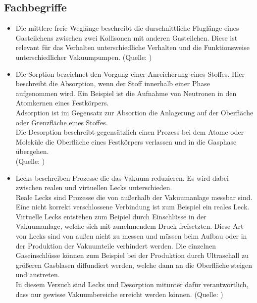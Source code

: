 	\subsection{Fachbegriffe}
	
		\begin{itemize}
			\item
			Die mittlere freie Weglänge beschreibt die durschnittliche Fluglänge eines Gasteilchens zwischen zwei Kollisonen mit anderen Gasteilchen.
			Diese ist relevant für das Verhalten unterschiedliche Verhalten und die Funktionsweise unterschiedlicher Vakuumpumpen.
			(Quelle: \cite{wiki:mfg})

			\item
			Die Sorption bezeichnet den Vorgang einer Anreicherung eines Stoffes. 
			Hier beschreibt die Absorption, wenn der Stoff innerhalb einer Phase aufgenommen wird. 
			Ein Beispiel ist die Aufnahme von Neutronen in den Atomkernen eines Festkörpers.\\
			Adsorption ist im Gegensatz zur Absortion die Anlagerung auf der Oberfläche oder Grenzfläche eines Stoffes.\\
			Die Desorption beschreibt gegensätzlich einen Prozess bei dem Atome oder Moleküle die Oberfläche eines Festkörpers verlassen und in die Gasphase übergehen.\\
			(Quelle: \cite{wiki:sorp})
			
			\item
			Lecks beschreiben Prozesse die das Vakuum reduzieren. Es wird dabei zwischen realen und virtuellen Lecks unterschieden.\\
			Reale Lecks sind Prozesse die von außerhalb der Vakuumanlage messbar sind. Eine nicht korrekt verschlossene Verbindung ist zum Beispiel ein reales Leck.\\
			Virtuelle Lecks entstehen zum Beipiel durch Einschlüsse in der Vakuumanlage, welche sich mit zunehmendem Druck freisetzten.
			Diese Art von Lecks sind von außen nicht zu messen und müssen beim Aufbau oder in der Produktion der Vakuumteile verhindert werden.
			Die einzelnen Gaseinschlüsse können zum Beispiel bei der Produktion durch Ultraschall zu größeren Gasblasen diffundiert werden, welche dann an die Oberfläche steigen und austreten.\\
			In diesem Versuch sind Lecks und Desorption mitunter dafür verantwortlich, dass nur gewisse Vakuumbereiche erreicht werden können. 
			(Quelle: \cite{pfeiffer:grund})
		\end{itemize}

